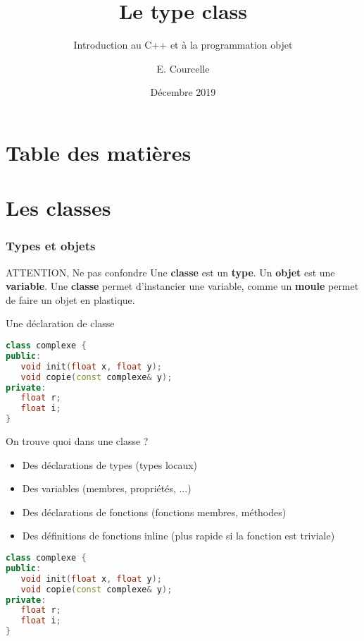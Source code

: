 \documentclass{beamer}
\title{Le type class}
\subtitle{Introduction au C++ et à la programmation objet}
\author{E. Courcelle}\institute{CALMIP, UMS 3669}
\date{Décembre 2019}
\begin{document}
\begin{frame}
\titlepage
\end{frame}

\section*{Table des matières}
\begin{frame}
\tableofcontents
\end{frame}


\section{Les classes}

\begin{frame}[fragile=singleslide,shrink=20]
\frametitle {Types et objets}

\begin{block}{ATTENTION, Ne pas confondre}
Une \textbf{classe} est un \textbf{type}.
Un \textbf{objet} est une \textbf{variable}.
Une \textbf{classe} permet d'instancier une variable, comme un \textbf{moule} permet de faire un objet en plastique.
\end{block}

\begin{block}{Une déclaration de classe}
\begin{lstlisting}[language=c++]
class complexe {
public:
   void init(float x, float y);
   void copie(const complexe& y);
private:
   float r;
   float i;
}
\end{lstlisting}
\end{block}

\begin{block}{On trouve quoi dans une classe ?}
\begin{itemize}
\item{Des déclarations de types (types locaux)}
\item{Des variables (membres, propriétés, ...)}
\item{Des déclarations de fonctions (fonctions membres, méthodes)}
\item{Des définitions de fonctions inline (plus rapide si la fonction est triviale)}
\end{itemize}
\begin{lstlisting}[language=c++]
class complexe {
public:
   void init(float x, float y);
   void copie(const complexe& y);
private:
   float r;
   float i;
}
\end{lstlisting}
\end{block}
\end{frame}
\end{document}
